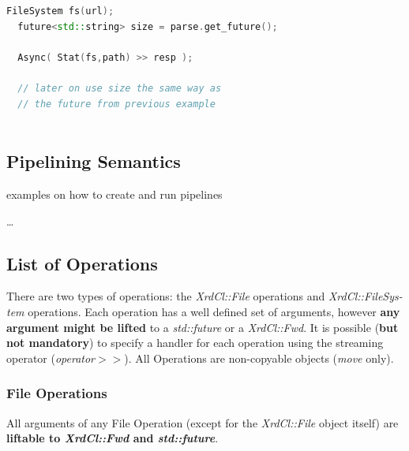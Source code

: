 \documentclass{article}
\begin{document}
\begin{itemize}
\begin{samepage}
\begin{lstlisting}[language=C++, xleftmargin=\dimexpr-\leftmargini]
  FileSystem fs(url);
  future<std::string> size = parse.get_future();

  Async( Stat(fs,path) >> resp );

  // later on use size the same way as 
  // the future from previous example
  
\end{lstlisting}
            
            \end{samepage}

        \end{itemize}
	
	\subsection{Pipelining Semantics}
	
	examples on how to create and run pipelines
	
	\ldots
	
	\subsection{List of Operations}
	\label{sec:lsop}
	
		There are two types of operations: the \textit{XrdCl::File} operations and \textit{XrdCl::FileSys-tem} operations. Each operation has a well defined
		set of arguments, however \textbf{any argument might be lifted} to a \textit{std::future} or a \textit{XrdCl::Fwd}. It is possible (\textbf{but not mandatory})
		to specify a handler for each operation using the streaming operator (\textit{operator$>$$>$}). All Operations are non-copyable objects (\textit{move} only).
		
		\subsubsection{File Operations}
		
			All arguments of any File Operation (except for the \textit{XrdCl::File} object itself) are \textbf{liftable to \textit{XrdCl::Fwd} and \textit{std::future}}.
			
\end{document}
